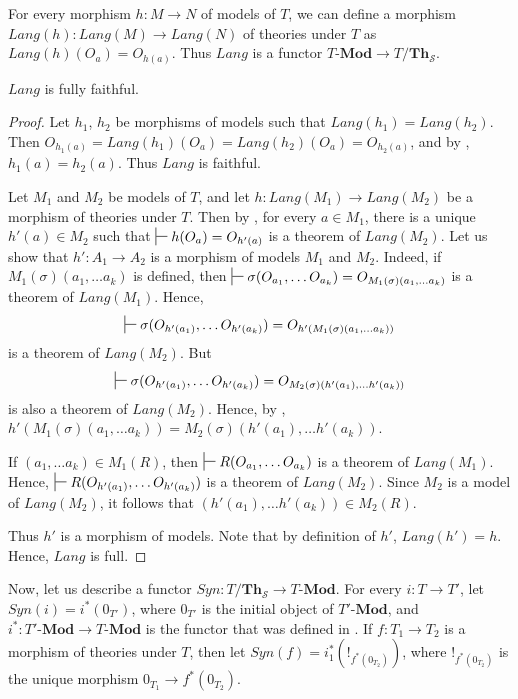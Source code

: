 \documentclass[reqno]{amsart}
\theoremstyle{definition}
\theoremstyle{remark}
\newcommand{\cat}[1]{\mathbf{#1}}
\newcommand{\Mod}[1]{#1\text{-}\cat{Mod}}
\newcommand{\Th}{\cat{Th}}
\numberwithin{figure}{section}
\begin{document}
For every morphism $h : M \to N$ of models of $T$, we can define a morphism $Lang(h) : Lang(M) \to Lang(N)$ of theories under $T$ as $Lang(h)(O_a) = O_{h(a)}$.
Thus $Lang$ is a functor $\Mod{T} \to T/\Th_\mathcal{S}$.

\begin{prop}[lang-ff]
$Lang$ is fully faithful.
\end{prop}
\begin{proof}
Let $h_1$, $h_2$ be morphisms of models such that $Lang(h_1) = Lang(h_2)$.
Then $O_{h_1(a)} = Lang(h_1)(O_a) = Lang(h_2)(O_a) = O_{h_2(a)}$, and by , $h_1(a) = h_2(a)$.
Thus $Lang$ is faithful.

Let $M_1$ and $M_2$ be models of $T$, and let $h : Lang(M_1) \to Lang(M_2)$ be a morphism of theories under $T$.
Then by , for every $a \in M_1$, there is a unique $h'(a) \in M_2$ such that $\sststile{}{} h(O_a) = O_{h'(a)}$ is a theorem of $Lang(M_2)$.
Let us show that $h' : A_1 \to A_2$ is a morphism of models $M_1$ and $M_2$.
Indeed, if $M_1(\sigma)(a_1, \ldots a_k)$ is defined, then $\sststile{}{} \sigma(O_{a_1}, \ldots O_{a_k}) = O_{M_1(\sigma)(a_1, \ldots a_k)}$ is a theorem of $Lang(M_1)$.
Hence, \[ \sststile{}{} \sigma(O_{h'(a_1)}, \ldots O_{h'(a_k)}) = O_{h'(M_1(\sigma)(a_1, \ldots a_k))} \] is a theorem of $Lang(M_2)$.
But \[ \sststile{}{} \sigma(O_{h'(a_1)}, \ldots O_{h'(a_k)}) = O_{M_2(\sigma)(h'(a_1), \ldots h'(a_k))} \] is also a theorem of $Lang(M_2)$.
Hence, by , $h'(M_1(\sigma)(a_1, \ldots a_k)) = M_2(\sigma)(h'(a_1), \ldots h'(a_k))$.

If $(a_1, \ldots a_k) \in M_1(R)$, then $\sststile{}{} R(O_{a_1}, \ldots O_{a_k})$ is a theorem of $Lang(M_1)$.
Hence, $\sststile{}{} R(O_{h'(a_1)}, \ldots O_{h'(a_k)})$ is a theorem of $Lang(M_2)$.
Since $M_2$ is a model of $Lang(M_2)$, it follows that $(h'(a_1), \ldots h'(a_k)) \in M_2(R)$.

Thus $h'$ is a morphism of models.
Note that by definition of $h'$, $Lang(h') = h$.
Hence, $Lang$ is full.
\end{proof}

Now, let us describe a functor $Syn : T/\Th_\mathcal{S} \to \Mod{T}$.
For every $i : T \to T'$, let $Syn(i) = i^*(0_{T'})$, where $0_{T'}$ is the initial object of $\Mod{T'}$,
and $i^* : \Mod{T'} \to \Mod{T}$ is the functor that was defined in \cite{alg-tt}.
If $f : T_1 \to T_2$ is a morphism of theories under $T$, then let $Syn(f) = i_1^*(!_{f^*(0_{T_2})})$,
where $!_{f^*(0_{T_2})}$ is the unique morphism $0_{T_1} \to f^*(0_{T_2})$.
\end{document}
